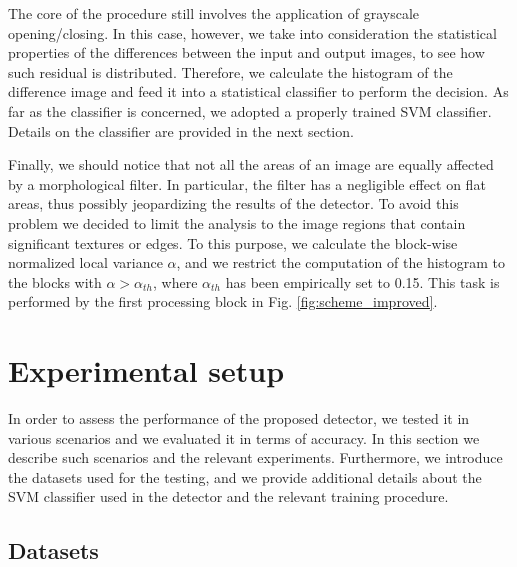\documentclass[review]{elsarticle}
\begin{document}
The core of the procedure still involves the application of grayscale opening/closing. In this case, however, we take into consideration the statistical properties of the differences between the input and output images, to see how such residual is distributed. Therefore, we calculate the histogram of the difference image and feed it into a statistical classifier to perform the decision. As far as the classifier is concerned, we adopted a properly trained SVM classifier. Details on the classifier are provided in the next section.

Finally, we should notice that not all the areas of an image are equally affected by a morphological filter. In particular, the filter has a negligible effect on flat areas, thus possibly jeopardizing the results of the detector. To avoid this problem we decided to limit the analysis to the image regions that contain significant textures or edges. To this purpose, we calculate the block-wise normalized local variance $\alpha$, and we restrict the computation of the histogram to the blocks with $\alpha > \alpha_{th}$, where $\alpha_{th}$ has been empirically set to 0.15. This task is performed by the first processing block in Fig. \ref{fig:scheme_improved}. 


\section{Experimental setup}
\label{sec:exp_setup}

In order to assess the performance of the proposed detector, we tested it in various scenarios and we evaluated it in terms of accuracy. In this section we describe such scenarios and the relevant experiments. Furthermore, we introduce the datasets used for the testing, and we provide additional details about the SVM classifier used in the detector and the relevant training procedure.

\subsection{Datasets}
\label{subsec:datasets}
\end{document}
